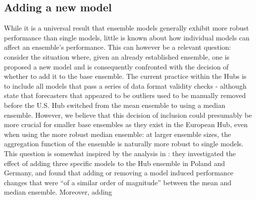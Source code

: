 \subsection{Adding a new model} \label{sub:adding_a_new_model}
While it is a universal result that ensemble models generally exhibit more robust performance than single models, little is known about how individual models can affect an ensemble's performance. This can however be a relevant question: consider the situation where, given an already established ensemble, one is proposed a new model and is consequently confronted with the decision of whether to add it to the base ensemble. The current practice within the Hubs is to include all models that pass a series of data format validity checks - although \cite{ray_challenges_2021} state that forecasters that appeared to be outliers used to be manually removed before the U.S. Hub switched from the mean ensemble to using a median ensemble. However, we believe that this decision of inclusion could presumably be more crucial for smaller base ensembles as they exist in the European Hub, even when using the more robust median ensemble: at larger ensemble sizes, the aggregation function of the ensemble is naturally more robust to single models.\\ 
This question is somewhat inspired by the analysis in \cite{bosse_comparing_2021-1}: they investigated the effect of adding three specific models to the Hub ensemble in Poland and Germany, and found that adding or removing a model induced performance changes that were ``of a similar order of magnitude'' between the mean and median ensemble. Moreover, adding \\ 
